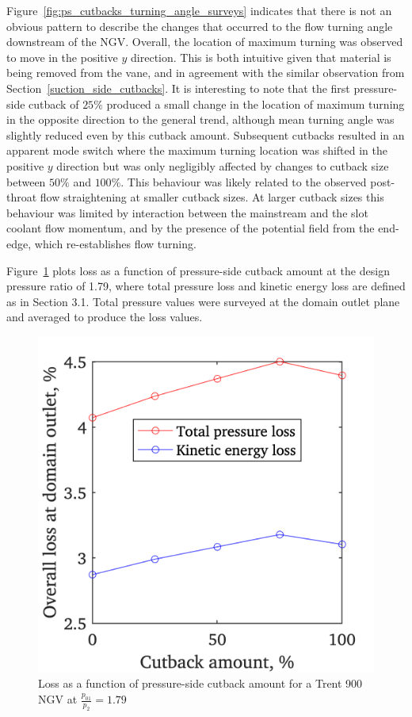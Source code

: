 \documentclass[a4paper, 11pt, oneside]{report}
\begin{document}
Figure~\ref{fig:ps_cutbacks_turning_angle_surveys} indicates that there is not an  obvious pattern to describe the changes that occurred to the flow turning angle downstream of the NGV. Overall, the location of maximum turning was observed to move in the positive $y$ direction. This is both intuitive given that material is being removed from the vane, and in agreement with the similar observation from Section~\ref{suction_side_cutbacks}. It is interesting to note that the first pressure-side cutback of $25\%$ produced a small change in the location of maximum turning in the opposite direction to the general trend, although mean turning angle was slightly reduced even by this cutback amount. Subsequent cutbacks resulted in an apparent mode switch where the maximum turning location was shifted in the positive $y$ direction but was only negligibly affected by changes to cutback size between $50\%$ and $100\%$. This behaviour was likely related to the observed post-throat flow straightening at smaller cutback sizes. At larger cutback sizes this behaviour was limited by interaction between the mainstream and the slot coolant flow momentum, and by the presence of the potential field from the end-edge, which re-establishes flow turning.

Figure~\ref{fig:ps_cutbacks_vs_losses} plots loss as a function of pressure-side cutback amount at the design pressure ratio of 1.79, where total pressure loss and kinetic energy loss are defined as in Section 3.1. Total pressure values were surveyed at the domain outlet plane and averaged to produce the loss values.

\begin{figure}[H]
	\centering
	\includegraphics[width=.45\textwidth]{figs/ps_cutbacks_vs_losses.png}
	\caption{Loss as a function of pressure-side cutback amount for a Trent 900 NGV at $\frac{p_{01}}{p_2}=1.79$}
    \label{fig:ps_cutbacks_vs_losses}
\end{figure}
\end{document}
